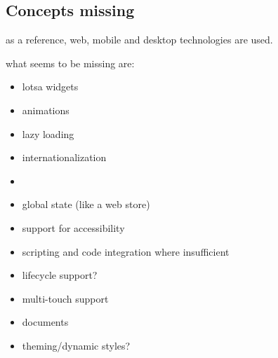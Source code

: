 \subsection{Concepts missing}\label{subsec:concepts-missing}

as a reference, web, mobile and desktop technologies are used.

what seems to be missing are:
\begin{itemize}
    \item lotsa widgets
    \item animations
    \item {}lazy loading
    \item {}internationalization
    \item
    \item global state (like a web store)

    \item support for accessibility
    \item scripting and code integration where insufficient
    \item lifecycle support?
    \item {} multi-touch support
    \item {} documents
    \item theming/dynamic styles?
\end{itemize}
